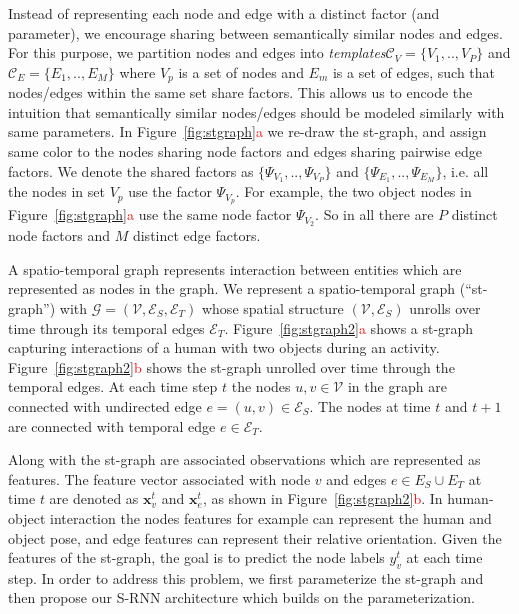 \documentclass[10pt,twocolumn,letterpaper]{article}
\newcommand{\ve}[1]{\mathbf{#1}}
\newcommand{\mcal}[1]{\mathcal{#1}}
\newcommand{\rc}[1]{\textcolor{red}{#1}}
\begin{document}
Instead of representing each node and edge  with a distinct factor (and parameter), we encourage sharing between semantically similar nodes and edges. For this purpose, we partition nodes and edges into \textit{templates}$\mcal{C}_V=\{V_1,..,V_P\}$ and $\mcal{C}_E=\{E_1,..,E_M\}$ where $V_p$ is a set of nodes and $E_m$ is a set of edges, such that nodes/edges within the same set share factors. This allows us to encode the intuition that semantically similar nodes/edges should be modeled similarly with same parameters. In Figure~\ref{fig:stgraph}\rc{a} we re-draw the st-graph, and assign same color to the nodes sharing node factors and edges sharing pairwise edge factors. We denote the shared factors as $\{\Psi_{V_1},..,\Psi_{V_P}\}$ and $\{\Psi_{E_1},..,\Psi_{E_M}\}$, i.e. all the nodes in set $V_p$ use the factor $\Psi_{V_p}$.  For example, the two object nodes in Figure~\ref{fig:stgraph}\rc{a} use the same node factor $\Psi_{V_2}$.  So in all there are $P$ distinct node factors and $M$ distinct edge factors.  


A spatio-temporal graph represents interaction between entities which are represented as nodes in the graph. We represent a spatio-temporal graph (``st-graph'') with $\mathcal{G}=(\mathcal{V},\mathcal{E}_S,\mathcal{E}_T)$  whose spatial structure $(\mathcal{V},\mathcal{E}_S)$ unrolls over time through its temporal edges $\mathcal{E}_T$. Figure~\ref{fig:stgraph2}\rc{a} shows a  st-graph capturing interactions of a human with two objects during an activity.  Figure~\ref{fig:stgraph2}\rc{b} shows the st-graph unrolled over time through the temporal edges. At each time step $t$ the nodes $u,v \in \mcal{V}$ in the graph are connected with undirected edge $e=(u,v) \in \mcal{E}_S$. The nodes at time $t$ and $t+1$ are connected with temporal edge $e \in \mcal{E}_T$.


Along with the st-graph are associated observations which are represented as features. The feature vector associated with node $v$ and edges $e \in E_S \cup E_T$ at time $t$ are denoted as $\ve{x}_v^t$ and $\ve{x}_e^t$, as shown in Figure~\ref{fig:stgraph2}\rc{b}. In human-object interaction the nodes features for example can represent the human and object pose, and edge features can represent their relative orientation.  Given the features of the st-graph, the goal is to predict the node labels $y_v^t$ at each time step. In order to address this problem, we first parameterize the st-graph and then propose our S-RNN architecture which builds on the parameterization. 
\end{document}
